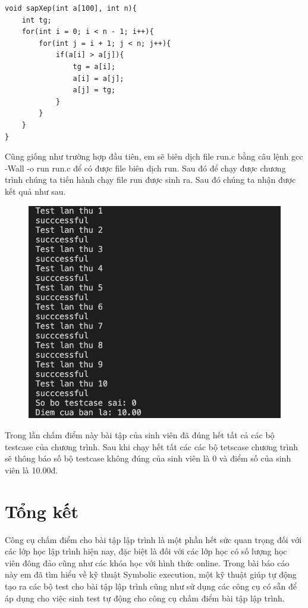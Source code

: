 \documentclass[12pt,a4paper]{report}
\begin{document}
\begin{lstlisting}
void sapXep(int a[100], int n){
    int tg;
    for(int i = 0; i < n - 1; i++){
        for(int j = i + 1; j < n; j++){
            if(a[i] > a[j]){
                tg = a[i];
                a[i] = a[j];
                a[j] = tg;        
            }
        }
    }
}
\end{lstlisting}

Cũng giống như trường hợp đầu tiên, em sẽ biên dịch file run.c bằng câu lệnh gcc -Wall -o run run.c để có được file biên dịch run. Sau đó để chạy được chương trình chúng ta tiến hành chạy file run được sinh ra. Sau đó chúng ta nhận được kết quả như sau.

\begin{figure}[ht]
\begin{center}
\includegraphics[scale=.2]{hinhanh/ketquademoarraydung.png}
\end{center}
\end{figure}

Trong lần chấm điểm này bài tập của sinh viên đã đúng hết tất cả các bộ testcase của chương trình. Sau khi chạy hết tất các các bộ tetscase chương trình sẽ thông báo số bộ testcase không đúng của sinh viên là 0 và điểm số của sinh viên là 10.00đ. \newpage

\chapter{Tổng kết}

Công cụ chấm điểm cho bài tập lập trình là một phần hết sức quan trọng đối với các lớp học lập trình hiện nay, đặc biệt là đối với các lớp học có số lượng học viên đông đảo cũng như các khóa học với hình thức online. Trong bài báo cáo này em đã tìm hiểu về kỹ thuật Symbolic execution, một kỹ thuật giúp tự động tạo ra các bộ test cho bài tập lập trình cũng như sử dụng các công cụ có sẵn để áp dụng cho việc sinh test tự động cho công cụ chấm điểm bài tập lập trình.
\end{document}
